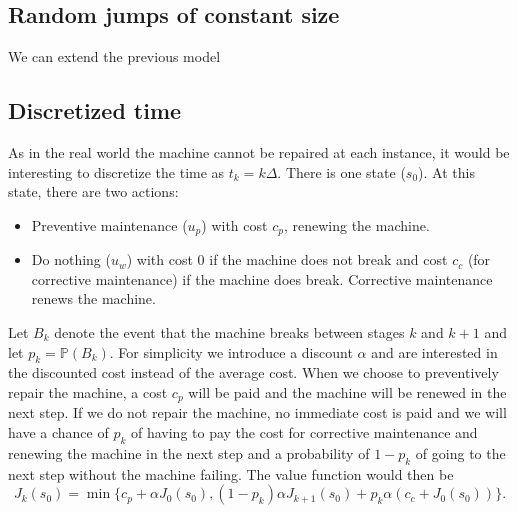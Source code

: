 \subsection{Random jumps of constant size}
We can extend the previous model

\subsection{Discretized time}
As in the real world the machine cannot be repaired at each instance, it would be interesting to discretize the time as $t_k=k\Delta$.
There is one state ($s_0$). At this state, there are two actions:
\begin{itemize}
\item Preventive maintenance ($u_p$) with cost $c_p$, renewing the machine.
\item Do nothing ($u_w$) with cost 0 if the machine does not break and cost $c_c$ (for corrective maintenance) if the machine does break. Corrective maintenance renews the machine.
\end{itemize}
Let $B_k$ denote the event that the machine breaks between stages $k$ and $k+1$ and let $p_k=\mathbb{P}(B_k)$. For simplicity we introduce a discount $\alpha$ and are interested in the discounted cost instead of the average cost. When we choose to preventively repair the machine, a cost $c_p$ will be paid and the machine will be renewed in the next step. If we do not repair the machine, no immediate cost is paid and we will have a chance of $p_k$ of having to pay the cost for corrective maintenance and renewing the machine in the next step and a probability of $1-p_k$ of going to the next step without the machine failing. The value function would then be 
$$
J_{k}(s_0)=\min\{c_p+ \alpha J_0(s_0),(1-p_k) \alpha J_{k+1}(s_0)+p_k \alpha (c_c+ J_0(s_0))\}.
$$


